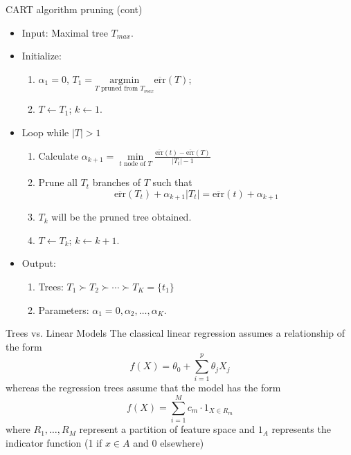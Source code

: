 \documentclass{beamer}
\begin{document}
\begin{frame}{CART algorithm pruning (cont)}
	\begin{itemize}
		\item Input: Maximal tree $T_{max}$.
		\item Initialize:
		\begin{enumerate}
			\item $\alpha_1=0$, $T_1 = \underset{ T \text{ pruned from }T_{max}  }{\textrm{argmin}}
			\overline{\text{err}} (T)$; 
			\item $T \leftarrow T_1$; $k\leftarrow1$. 
		\end{enumerate}
	\item Loop while $|T|>1$
	\begin{enumerate}
		\item Calculate $\alpha_{k+1}= \underset{ t \text{ node of }T  }{\min}
		\frac{\overline{\text{err}} (t)- \overline{\text{err}}(T)}{|T_t| -1}$
		\item Prune all $T_t$ branches of $T$ such that
		\begin{equation*}
			\overline{\text{err}}(T_t)+ \alpha_{k+1}|T_t|= \overline{\text{err}}(t)+ \alpha_{k+1}
		\end{equation*}
	\item $T_k$ will be the pruned tree obtained. 
	\item $T\leftarrow T_k$; $k\leftarrow k+1$.
	\end{enumerate}
	\item Output: 
	\begin{enumerate}
		\item Trees: $T_1 \succ T_2 \succ \cdots \succ T_K=\{t_1\}$
		\item Parameters: $\alpha_1=0, \alpha_2, \ldots, \alpha_K$.
	\end{enumerate}
	\end{itemize}
\end{frame}


\begin{frame}{Trees vs. Linear Models}
	The classical linear regression assumes a relationship of the form
	\begin{equation*}
		f(X)= \theta_0 + \sum_{i=1}^p \theta_j X_j
	\end{equation*}
whereas the regression trees assume that the model has the form
\begin{equation*}
	f(X)=\sum_{i=1}^M c_m \cdot 1_{X \in R_m}
\end{equation*}
where $R_1,\ldots,R_M$ represent a partition of feature space and $1_A$ represents the indicator function (1 if $x\in A$ and 0 elsewhere)
\end{frame}
\end{document}
